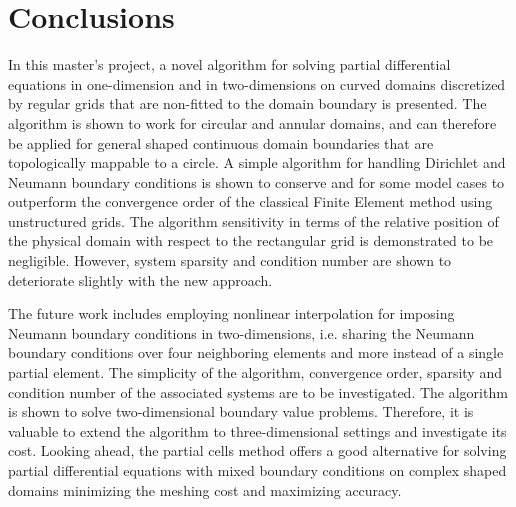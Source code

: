 \documentclass[12pt,twoside]{article}
\def\ssp{\def\baselinestretch{1.0}\large\normalsize}
\begin{document}
\section{Conclusions}\label{sec:conc}
\par
In this master's project, a novel algorithm for solving partial differential equations in one-dimension and in two-dimensions on curved domains discretized by regular grids that are non-fitted to the domain boundary is presented. The algorithm is shown to work for circular and annular domains, and can therefore be applied for general shaped continuous domain boundaries that are topologically mappable to a circle. A simple algorithm for handling Dirichlet and Neumann boundary conditions is shown to conserve and for some model cases to outperform the convergence order of the classical Finite Element method using unstructured grids. The algorithm sensitivity in terms of the relative position of the physical domain with respect to the rectangular grid is demonstrated to be negligible.  However, system sparsity and condition number are shown to deteriorate slightly with the new approach. 
\par
The future work includes employing nonlinear interpolation for imposing Neumann boundary conditions in two-dimensions, i.e.  sharing the Neumann boundary conditions over four neighboring elements and more instead of a single partial element. The simplicity of the algorithm, convergence order, sparsity and condition number of the associated systems are to be investigated. The algorithm is shown to solve two-dimensional boundary value problems. Therefore, it is valuable to extend the algorithm to three-dimensional settings and investigate its cost. Looking ahead, the partial cells method offers a good alternative for solving partial differential equations with mixed boundary conditions on complex shaped domains minimizing the meshing cost and maximizing accuracy.  
%
%
\newpage
\protect\vspace{0.2in}
\par\noindent
{}
\ssp

\newpage
\clearpage


%
%
\appendix
\end{document}
